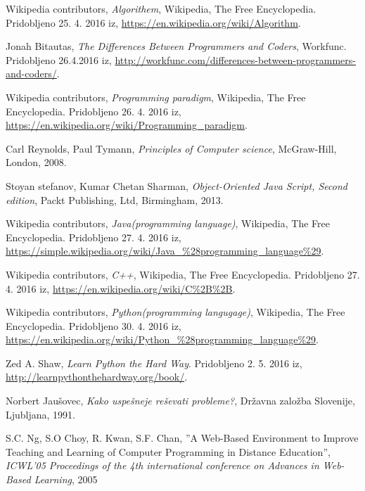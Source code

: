 \begin{thebibliography}{100}
 Wikipedia contributors, \emph{Algorithem},
  Wikipedia, The Free Encyclopedia. Pridobljeno 25. 4. 2016 iz,
  \url{https://en.wikipedia.org/wiki/Algorithm}.

 Jonah Bitautas, \emph{The Differences Between
    Programmers and Coders}, Workfunc. Pridobljeno 26.4.2016 iz,
  \url{http://workfunc.com/differences-between-programmers-and-coders/}.

 Wikipedia contributors, \emph{Programming paradigm}, Wikipedia, The Free Encyclopedia. Pridobljeno
  26. 4. 2016 iz,
  \url{https://en.wikipedia.org/wiki/Programming_paradigm}.

 Carl Reynolds, Paul Tymann, \emph{Principles of Computer science},
  McGraw-Hill, London, 2008.

 Stoyan stefanov, Kumar Chetan Sharman, \emph{Object-Oriented Java Script,
    Second edition}, Packt Publishing, Ltd, Birmingham, 2013.

 Wikipedia contributors, \emph{Java(programming
    language)}, Wikipedia, The Free Encyclopedia. Pridobljeno
  27. 4. 2016 iz,
  \url{https://simple.wikipedia.org/wiki/Java_%28programming_language%29}.

 Wikipedia contributors, \emph{C++}, Wikipedia, The
  Free Encyclopedia. Pridobljeno 27. 4. 2016 iz,
  \url{https://en.wikipedia.org/wiki/C%2B%2B}.

 Wikipedia contributors, \emph{Python(programming
    langugage)}, Wikipedia, The
  Free Encyclopedia. Pridobljeno 30. 4. 2016 iz,
  \url{https://en.wikipedia.org/wiki/Python_%28programming_language%29}.

 Zed A. Shaw, \emph{Learn Python the Hard Way}. Pridobljeno 2. 5. 2016
  iz, \url{http://learnpythonthehardway.org/book/}.

 Norbert Jaušovec, \emph{Kako uspešneje
    reševati probleme?}, Državna založba Slovenije, Ljubljana, 1991.


 S.C. Ng, S.O Choy, R. Kwan, S.F. Chan,
  ''A Web-Based Environment to Improve Teaching and Learning of
  Computer Programming in Distance Education'', \emph{ICWL'05
    Proceedings of the 4th international conference on Advances in
    Web-Based Learning}, 2005


\end{thebibliography}
